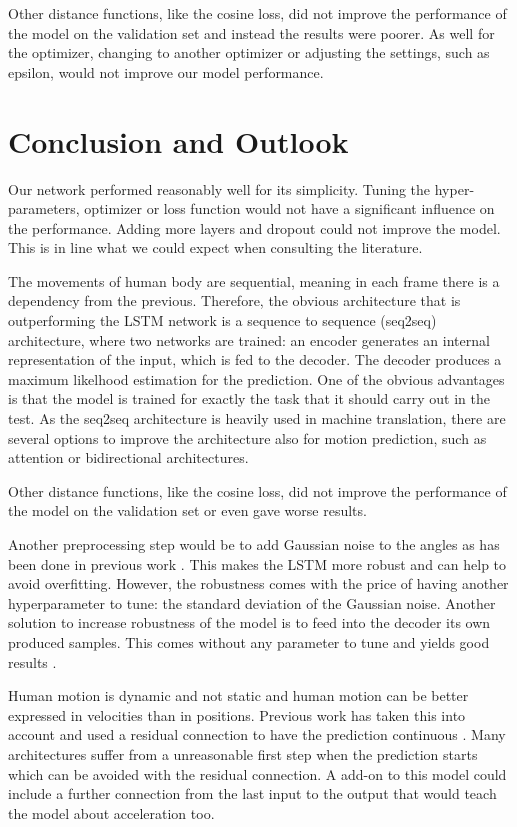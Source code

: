 Other distance functions, like the cosine loss, did not improve the performance of the model on the validation set and instead the results were poorer. As well for the optimizer, changing to another optimizer or adjusting the settings, such as epsilon, would not improve our model performance. 

\section{Conclusion and Outlook}
Our network performed reasonably well for its simplicity. Tuning the hyper-parameters, optimizer or loss function would not have a significant influence on the performance. Adding more layers and dropout could not improve the model. This is in line what we could expect when consulting the literature. 

The movements of human body are sequential, meaning in each frame there is a dependency from the previous. Therefore, the obvious architecture that is outperforming the LSTM network is a sequence to sequence (seq2seq) architecture, where two networks are trained: an encoder generates an internal representation of the input, which is fed to the decoder. The decoder produces a maximum likelhood estimation for the prediction. One of the obvious advantages is that  the model is trained for exactly the task that it should carry out in the test. As the seq2seq architecture is heavily used in machine translation, there are several options to improve the architecture also for motion prediction, such as attention or bidirectional architectures. 

Other distance functions, like the cosine loss, did not improve the performance of the model on the validation set or even gave worse results. 


Another preprocessing step would be to add Gaussian noise to the angles as has been done in previous work \cite{Fragkiadaki2014}. This makes the LSTM more robust and can help to avoid overfitting. However, the robustness comes with the price of having another hyperparameter to tune: the standard deviation of the Gaussian noise. Another solution to increase robustness of the model is to feed into the decoder its own produced samples. This comes without any parameter to tune and yields good results \cite{Martinez2017}.

Human motion is dynamic and not static and human motion can be better expressed in velocities than in positions. Previous work has taken this into account and used a residual connection to have the prediction continuous \cite{Martinez2017}. Many architectures suffer from a unreasonable first step when the prediction starts which can be avoided with the residual connection. A add-on to this model could include a further connection from the last input to the output that would teach the model about acceleration too. 


